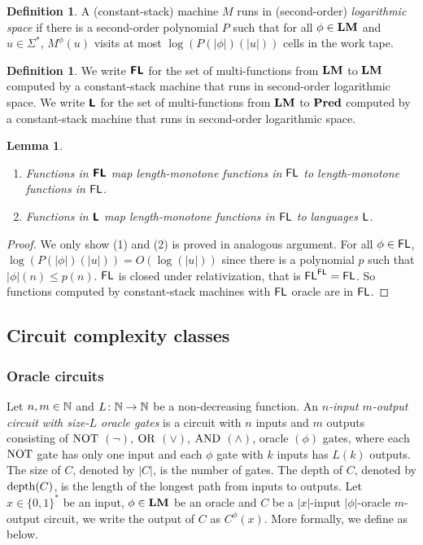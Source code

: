 \documentclass{article}
\newtheorem{lemma}[theorem]{Lemma}
\theoremstyle{definition}
\newtheorem{definition}[theorem]{Definition}
\theoremstyle{remark}
\begin{document}
\begin{definition}
 A (constant-stack) machine $M$ runs in (second-order) \emph{logarithmic space}
 if there is a second-order polynomial $P$ such that for all $\phi \in \mathbf{LM}$
 and $u \in \Sigma^*$, $M^\phi(u)$ visits at most $\log(P(|\phi|)(|u|))$ cells
 in the work tape.
\end{definition}

\begin{definition}
 We write $\text{\bfseries \sffamily \upshape FL}$ for the set of multi-functions from $\mathbf{LM}$ to $\mathbf{LM}$
 computed by a constant-stack machine that runs in second-order logarithmic space.
 We write $\text{\bfseries \sffamily \upshape L}$ for the set of multi-functions from $\mathbf{LM}$ to $\mathbf{Pred}$
 computed by a constant-stack machine that runs in second-order logarithmic space.
\end{definition}

\begin{lemma}
\label{lemma:Ltwo-maps-L-to-L}
\mbox{}
\begin{enumerate}
 \item Functions in $\text{\bfseries \sffamily \upshape FL}$ map length-monotone functions in $\mathsf{FL}$
       to length-monotone functions in $\mathsf{FL}$.
 \item Functions in $\text{\bfseries \sffamily \upshape L}$ map length-monotone functions in $\mathsf{FL}$
       to languages $\mathsf{L}$.
\end{enumerate}
\end{lemma}

\begin{proof}
We only show (1) and (2) is proved in analogous argument.
For all $\phi \in \mathsf{FL}$, $\log(P(|\phi|)(|u|)) = O(\log(|u|))$
since there is a polynomial $p$ such that $|\phi|(n) \le p(n)$.
$\mathsf{FL}$ is closed under relativization, that is $\mathsf{FL}^{\mathsf{FL}} = \mathsf{FL}$.
So functions computed by constant-stack machines with $\mathsf{FL}$ oracle are in $\mathsf{FL}$.
\end{proof}


\subsection{Circuit complexity classes}
\subsubsection{Oracle circuits}

Let $n, m \in \mathbb N$ and $L \colon \mathbb N \to \mathbb N$ be a non-decreasing function.
An \emph{$n$-input $m$-output circuit with size-$L$ oracle gates} is a circuit with
$n$ inputs and $m$ outputs consisting of 
$\mathrm{NOT}$ $(\neg)$, $\mathrm{OR}$ $(\vee)$, $\mathrm{AND}$ $(\wedge)$, oracle $(\phi)$ gates,
where each $\mathrm{NOT}$ gate has only one input and each $\phi$ gate with $k$ inputs
has $L(k)$ outputs.
The size of $C$, denoted by $|C|$, is the number of gates.
The depth of $C$, denoted by $\mathop{\rm depth}(C)$, is the length of the longest path
from inputs to outputs.
Let $x \in \{0, 1\}^*$ be an input, $\phi \in \mathbf{LM}$ be an oracle and
$C$ be a $|x|$-input $|\phi|$-oracle $m$-output circuit,
we write the output of $C$ as $C^\phi(x)$.
More formally, we define as below.
\end{document}
